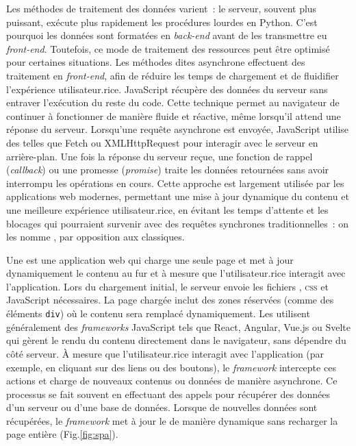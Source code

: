 Les méthodes de traitement des données varient~: le serveur, souvent
plus puissant, exécute plus rapidement les procédures lourdes en Python.
C'est pourquoi les données sont formatées en \textit{back-end} avant de les
transmettre eu \textit{front-end}. Toutefois, ce mode de traitement des
ressources peut être optimisé pour certaines situations. Les méthodes
dites asynchrone effectuent des traitement en \textit{front-end}, afin de réduire
les temps de chargement et de fluidifier l'expérience utilisateur.rice.
JavaScript récupère des données du serveur sans entraver l'exécution du
reste du code. Cette technique permet au navigateur de continuer à
fonctionner de manière fluide et réactive, même lorsqu'il attend une
réponse du serveur. Lorsqu'une requête asynchrone est envoyée,
JavaScript utilise des \apis telles que Fetch ou XMLHttpRequest pour
interagir avec le serveur en arrière-plan. Une fois la réponse du
serveur reçue, une fonction de rappel (\textit{callback}) ou une promesse
(\textit{promise}) traite les données retournées sans avoir interrompu les
opérations en cours. Cette approche est largement utilisée par les
applications web modernes, permettant une mise à jour dynamique du
contenu et une meilleure expérience utilisateur.rice, en évitant les temps
d'attente et les blocages qui pourraient survenir avec des requêtes
synchrones traditionnelles~: on les nomme \spa, par opposition aux \mpa classiques.

Une \spa est une application web qui charge
une seule page \html et met à jour dynamiquement le contenu au fur et à
mesure que l'utilisateur.rice interagit avec l'application. Lors du
chargement initial, le serveur envoie les fichiers \html, \textsc{css} et
JavaScript nécessaires. La page \html chargée inclut des zones réservées
(comme des éléments \texttt{div}) où le contenu sera remplacé dynamiquement. Les \spa utilisent
généralement des \textit{frameworks} JavaScript tels que React, Angular, Vue.js
ou Svelte qui gèrent le rendu du contenu directement dans le navigateur,
sans dépendre du côté serveur. À mesure que l'utilisateur.rice interagit avec
l'application (par exemple, en cliquant sur des liens ou des boutons),
le \textit{framework} intercepte ces actions et charge de nouveaux contenus ou
données de manière asynchrone. Ce processus se fait souvent en
effectuant des appels \api pour récupérer des données d'un serveur ou
d'une base de données. Lorsque de nouvelles données sont récupérées, le
\textit{framework} met à jour le \dom de manière dynamique sans recharger la page
entière (Fig.\ref{fig:spa}).

